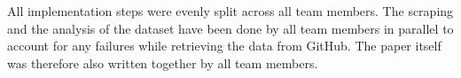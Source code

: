 All implementation steps were evenly split across all team members. The scraping
and the analysis of the dataset have been done by all team members in parallel to
account for any failures while retrieving the data from GitHub. The paper itself
was therefore also written together by all team members.
